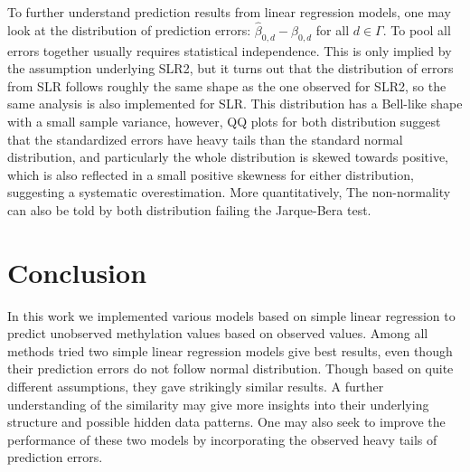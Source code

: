 \documentclass{article} %
\begin{document}
To further understand prediction results from linear regression models, one may look at the distribution of prediction errors: $\hat{\beta}_{0,d} - \beta_{0,d}$ for all $d\in\Gamma$. To pool all errors together usually requires statistical independence. This is only implied by the assumption underlying SLR2, but it turns out that the distribution of errors from SLR follows roughly the same shape as the one observed for SLR2, so the same analysis is also implemented for SLR. This distribution has a Bell-like shape with a small sample variance, however, QQ plots for both distribution suggest that the standardized errors have heavy tails than the standard normal distribution, and particularly the whole distribution is skewed towards positive, which is also reflected in a small positive skewness for either distribution, suggesting a systematic overestimation. More quantitatively, The non-normality can also be told by both distribution failing the Jarque-Bera test. 

\section{Conclusion}
In this work we implemented various models based on simple linear regression to predict unobserved methylation values based on observed values. Among all methods tried two simple linear regression models give best results, even though their prediction errors do not follow normal distribution. Though based on quite different assumptions, they gave strikingly similar results. A further understanding of the similarity may give more insights into their underlying structure and possible hidden data patterns. One may also seek to improve the performance of these two models by incorporating the observed heavy tails of prediction errors.



\end{document}
